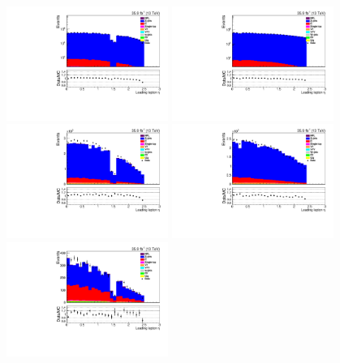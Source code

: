 \begin{figure}[h]
\centering
\includegraphics[width=0.47\textwidth]{figs/background-estimation/plots/unblinded/prompt_ee_ttbarInc/lep1Eta_NPL_ee_lepSel_ee_log.pdf}
\includegraphics[width=0.47\textwidth]{figs/background-estimation/plots/unblinded/prompt_mumu_ttbarInc/lep1Eta_NPL_mumu_lepSel_mumu_log.pdf}
\\
\includegraphics[width=0.47\textwidth]{figs/background-estimation/plots/unblinded/prompt_ee_ttbarInc/lep1Eta_NPL_ee_jetSel_ee.pdf}
\includegraphics[width=0.47\textwidth]{figs/background-estimation/plots/unblinded/prompt_mumu_ttbarInc/lep1Eta_NPL_mumu_jetSel_mumu.pdf}
\\
\includegraphics[width=0.47\textwidth]{figs/background-estimation/plots/unblinded/prompt_ee_ttbarInc/lep1Eta_NPL_ee_wMass_ee.pdf}

\end{figure}

